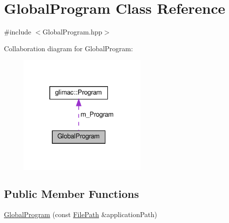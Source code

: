 \hypertarget{class_global_program}{}\section{Global\+Program Class Reference}
\label{class_global_program}


{\ttfamily \#include $<$Global\+Program.\+hpp$>$}



Collaboration diagram for Global\+Program\+:\nopagebreak
\begin{figure}[H]
\begin{center}
\leavevmode
\includegraphics[width=178pt]{class_global_program__coll__graph}
\end{center}
\end{figure}
\subsection*{Public Member Functions}
\begin{DoxyCompactItemize}
\item 
\hyperlink{class_global_program_ab5e0c2e652b403ac3266d91a0a315532}{Global\+Program} (const \hyperlink{classglimac_1_1_file_path}{File\+Path} \&application\+Path)
\end{DoxyCompactItemize}
